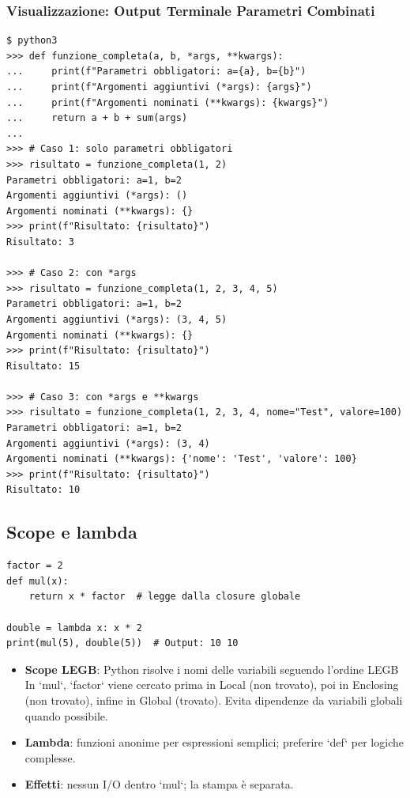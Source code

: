 \subsubsection{Visualizzazione: Output Terminale Parametri Combinati}
\label{subsubsec:fun-combinazione-terminal}
\begin{tcolorbox}[title=Esecuzione con Parametri Combinati, colback=black!5, colframe=blue!50!black]
\begin{lstlisting}[style=python]
$ python3
>>> def funzione_completa(a, b, *args, **kwargs):
...     print(f"Parametri obbligatori: a={a}, b={b}")
...     print(f"Argomenti aggiuntivi (*args): {args}")
...     print(f"Argomenti nominati (**kwargs): {kwargs}")
...     return a + b + sum(args)
...
>>> # Caso 1: solo parametri obbligatori
>>> risultato = funzione_completa(1, 2)
Parametri obbligatori: a=1, b=2
Argomenti aggiuntivi (*args): ()
Argomenti nominati (**kwargs): {}
>>> print(f"Risultato: {risultato}")
Risultato: 3

>>> # Caso 2: con *args
>>> risultato = funzione_completa(1, 2, 3, 4, 5)
Parametri obbligatori: a=1, b=2
Argomenti aggiuntivi (*args): (3, 4, 5)
Argomenti nominati (**kwargs): {}
>>> print(f"Risultato: {risultato}")
Risultato: 15

>>> # Caso 3: con *args e **kwargs
>>> risultato = funzione_completa(1, 2, 3, 4, nome="Test", valore=100)
Parametri obbligatori: a=1, b=2
Argomenti aggiuntivi (*args): (3, 4)
Argomenti nominati (**kwargs): {'nome': 'Test', 'valore': 100}
>>> print(f"Risultato: {risultato}")
Risultato: 10
\end{lstlisting}
\end{tcolorbox}

\subsection{Scope e lambda}
\label{subsec:fun-scope-lambda}
\begin{lstlisting}
factor = 2
def mul(x):
    return x * factor  # legge dalla closure globale

double = lambda x: x * 2
print(mul(5), double(5))  # Output: 10 10
\end{lstlisting}
\begin{tcolorbox}[title=Spiegazione del codice]
\begin{itemize}
  \item \textbf{Scope LEGB}: Python risolve i nomi delle variabili seguendo l'ordine LEGB
  In `mul`, `factor` viene cercato prima in Local (non trovato), poi in Enclosing (non trovato), infine in Global (trovato). Evita dipendenze da variabili globali quando possibile.
  \item \textbf{Lambda}: funzioni anonime per espressioni semplici; preferire `def` per logiche complesse.
  \item \textbf{Effetti}: nessun I/O dentro `mul`; la stampa è separata.
\end{itemize}
\end{tcolorbox}

